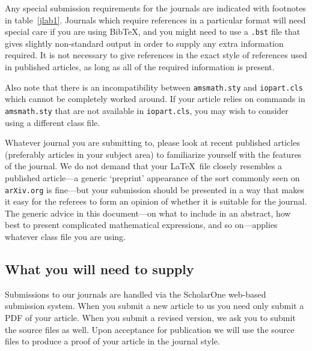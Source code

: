 \documentclass[12pt]{iopart}
\begin{document}
Any special submission requirements for the journals are indicated with footnotes in table~\ref{jlab1}.
Journals which require references in a particular format will need special care if you are using BibTeX, and you might need to use a \verb".bst" file
that gives slightly non-standard output in order to supply any extra information required.  It is not
necessary to give references in the exact style of references used in published articles, as long as all of
the required information is present.

Also note that there is an incompatibility
between \verb"amsmath.sty" and \verb"iopart.cls" which cannot be completely worked around.  If your article relies
on commands in \verb"amsmath.sty" that are not available in \verb"iopart.cls", you may wish to consider using a different
class file.

Whatever journal you are submitting to, please look at recent published articles (preferably
articles in your subject area) to familiarize yourself with the features of the journal.  We do not demand
that your \LaTeX\ file closely resembles a published article---a generic `preprint' appearance of the sort
commonly seen on \verb"arXiv.org" is fine---but your submission should be presented
in a way that makes it easy for the referees to form an opinion of whether it is suitable for the journal.
The generic advice in this document---on what to include in an abstract, how best to present complicated
mathematical expressions, and so on---applies whatever class file you are using.

\subsection{What you will need to supply}
Submissions to our journals are handled via the ScholarOne web-based submission system.  When you submit
a new article to us you need only submit a PDF of your article.  When you submit a revised version,
we ask you to submit the source files as well.  Upon acceptance for publication we will use the source files to produce a proof of your article in the journal style. 
\end{document}
